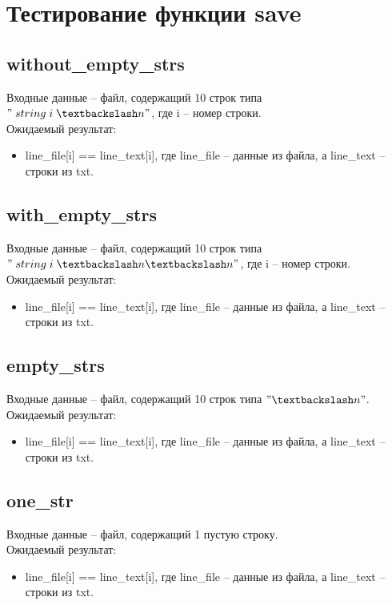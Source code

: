 \documentclass{article}
\begin{document}
\section{Тестирование функции save}
\subsection{without\_empty\_strs}
Входные данные -- файл, содержащий 10 строк типа $"\; string\; i\; \textbackslash n"$, где i -- номер строки.\\
Ожидаемый результат: 
\begin{itemize}
    \item line\_file[i] == line\_text[i], где line\_file -- данные из файла, а line\_text -- строки из txt. 
\end{itemize}
\subsection{with\_empty\_strs}
Входные данные -- файл, содержащий 10 строк типа $"\; string\; i\; \textbackslash n \textbackslash n"$, где i -- номер строки.\\
Ожидаемый результат: 
\begin{itemize}
    \item line\_file[i] == line\_text[i], где line\_file -- данные из файла, а line\_text -- строки из txt.
\end{itemize}
\subsection{empty\_strs}
Входные данные -- файл, содержащий 10 строк типа $"\textbackslash n"$.\\
Ожидаемый результат: 
\begin{itemize}
    \item line\_file[i] == line\_text[i], где line\_file -- данные из файла, а line\_text -- строки из txt.
\end{itemize}
\subsection{one\_str}
Входные данные -- файл, содержащий 1 пустую строку.\\
Ожидаемый результат:
\begin{itemize}
    \item line\_file[i] == line\_text[i], где line\_file -- данные из файла, а line\_text -- строки из txt.
\end{itemize}
\end{document}
